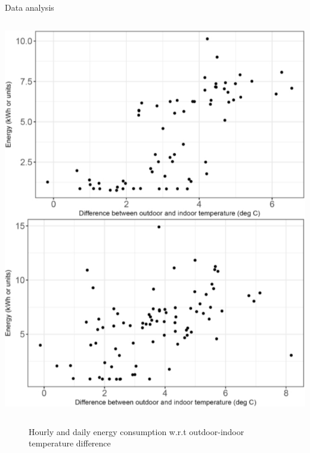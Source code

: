 \documentclass[aspectratio=169]{beamer}
\begin{document}
\begin{frame}{Data analysis}
\begin{columns}
        \centering
        \includegraphics[scale = 0.205]{pic/daily_energy_consume.png}
    \end{columns}
    \begin{figure}
        \caption{\footnotesize Hourly and daily energy consumption w.r.t outdoor-indoor temperature difference}
    \end{figure}
\end{frame}
\end{document}
